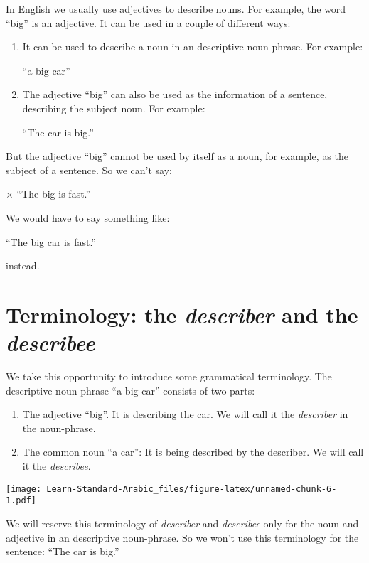 \documentclass[
  10pt,
]{book}
\providecommand{\tightlist}{%
  \setlength{\itemsep}{0pt}\setlength{\parskip}{0pt}}
\begin{document}
In English we usually use adjectives to describe nouns. For example, the word \enquote{big} is an adjective. It can be used in a couple of different ways:

\begin{enumerate}
\def\labelenumi{\arabic{enumi}.}
\item
  It can be used to describe a noun in an descriptive noun-phrase. For example:

  \enquote{a big car}
\item
  The adjective \enquote{big} can also be used as the information of a sentence, describing the subject noun. For example:

  \enquote{The car is big.}
\end{enumerate}

But the adjective \enquote{big} cannot be used by itself as a noun, for example, as the subject of a sentence. So we can't say:

\(\times\) \enquote{The big is fast.}

We would have to say something like:

\enquote{The big car is fast.}

instead.

\section{\texorpdfstring{Terminology: the \emph{describer} and the \emph{describee}}{Terminology: the describer and the describee}}\label{terminology-the-describer-and-the-describee}

We take this opportunity to introduce some grammatical terminology. The descriptive noun-phrase \enquote{a big car} consists of two parts:

\begin{enumerate}
\def\labelenumi{\roman{enumi}.}
\tightlist
\item
  The adjective \enquote{big}. It is describing the car. We will call it the \emph{describer} in the noun-phrase.
\item
  The common noun \enquote{a car}: It is being described by the describer. We will call it the \emph{describee}.
\end{enumerate}

\texttt{[image: Learn-Standard-Arabic\_files/figure-latex/unnamed-chunk-6-1.pdf]}

We will reserve this terminology of \emph{describer} and \emph{describee} only for the noun and adjective in an descriptive noun-phrase. So we won't use this terminology for the sentence: \enquote{The car is big.}
\end{document}
